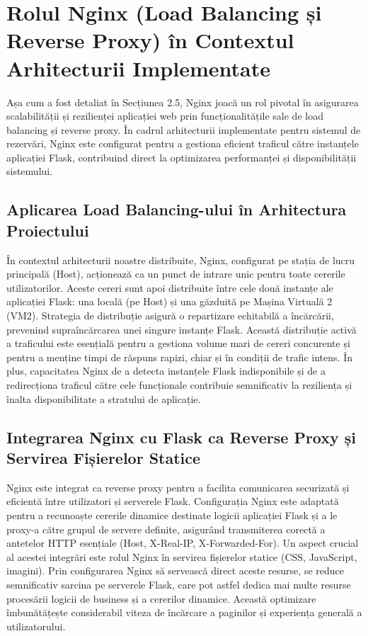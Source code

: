 \documentclass[12pt, a4paper, oneside, romanian]{teza-upb}
\begin{document}
\section{Rolul Nginx (Load Balancing și Reverse Proxy) în Contextul Arhitecturii Implementate}
Așa cum a fost detaliat în Secțiunea 2.5, Nginx joacă un rol pivotal în asigurarea scalabilității și rezilienței aplicației web prin funcționalitățile sale de load balancing și reverse proxy. În cadrul arhitecturii implementate pentru sistemul de rezervări, Nginx este configurat pentru a gestiona eficient traficul către instanțele aplicației Flask, contribuind direct la optimizarea performanței și disponibilității sistemului.



\subsection{Aplicarea Load Balancing-ului în Arhitectura Proiectului}
În contextul arhitecturii noastre distribuite, Nginx, configurat pe stația de lucru principală (Host), acționează ca un punct de intrare unic pentru toate cererile utilizatorilor. Aceste cereri sunt apoi distribuite între cele două instanțe ale aplicației Flask: una locală (pe Host) și una găzduită pe Mașina Virtuală 2 (VM2). Strategia de distribuție asigură o repartizare echitabilă a încărcării, prevenind supraîncărcarea unei singure instanțe Flask. Această distribuție activă a traficului este esențială pentru a gestiona volume mari de cereri concurente și pentru a menține timpi de răspuns rapizi, chiar și în condiții de trafic intens. În plus, capacitatea Nginx de a detecta instanțele Flask indisponibile și de a redirecționa traficul către cele funcționale contribuie semnificativ la reziliența și înalta disponibilitate a stratului de aplicație.

\subsection{Integrarea Nginx cu Flask ca Reverse Proxy și Servirea Fișierelor Statice}
Nginx este integrat ca reverse proxy pentru a facilita comunicarea securizată și eficientă între utilizatori și serverele Flask. Configurația Nginx este adaptată pentru a recunoaște cererile dinamice destinate logicii aplicației Flask și a le proxy-a către grupul de servere definite, asigurând transmiterea corectă a antetelor HTTP esențiale (Host, X-Real-IP, X-Forwarded-For). Un aspect crucial al acestei integrări este rolul Nginx în servirea fișierelor statice (CSS, JavaScript, imagini). Prin configurarea Nginx să servească direct aceste resurse, se reduce semnificativ sarcina pe serverele Flask, care pot astfel dedica mai multe resurse procesării logicii de business și a cererilor dinamice. Această optimizare îmbunătățește considerabil viteza de încărcare a paginilor și experiența generală a utilizatorului.
\end{document}
